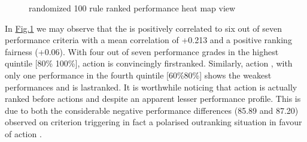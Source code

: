 \documentclass[a4paper,12pt,english]{sphinxhowto}
\let\sphinxpxdimen\pdfpxdimen\else\newdimen\sphinxpxdimen
\begin{document}
\begin{figure}[H]
\centering
\capstart

\noindent\sphinxincludegraphics[width=400\sphinxpxdimen]{{BachetHeatmap}.png}
\caption{ randomized 100 rule ranked performance heat map view}\label{\detokenize{pearls:bachetheatmap}}\end{figure}

\sphinxAtStartPar
In \hyperref[\detokenize{pearls:bachetheatmap}]{Fig.\@ \ref{\detokenize{pearls:bachetheatmap}}} we may observe that the  is positively correlated to six out of seven performance criteria with a mean correlation of +0.213 and a positive ranking fairness (+0.06).  With four out of seven performance grades in the highest quintile {[}80\% \sphinxhyphen{} 100\%{]}, action  is convincingly first\sphinxhyphen{}ranked. Similarly, action , with only one performance in the fourth quintile {[}60\%\sphinxhyphen{}80\%{]} shows the weakest performances and is last\sphinxhyphen{}ranked. It is worthwhile noticing that action  is actually ranked before actions  and  despite an apparent lesser performance profile. This is due to both the considerable negative performance differences (\sphinxhyphen{}85.89 and \sphinxhyphen{}87.20) observed on criterion  triggering in fact a polarised outranking situation in favour of action .
\end{document}
